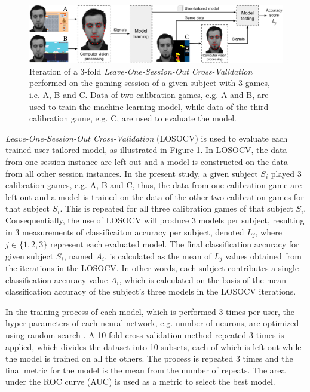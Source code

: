 \begin{figure}[ht]
    \centering
    \includegraphics[width=\textwidth]{Content/figures/machine-learning-investigation}
    \caption{Iteration of a 3-fold \textit{Leave-One-Session-Out Cross-Validation} performed on the gaming session of a given subject with 3 games, i.e. A, B and C. Data of two calibration games, e.g. A and B, are used to train the machine learning model, while data of the third calibration game, e.g. C, are used to evaluate the model.}
    \label{fig:study5-training-evaluation}
\end{figure}

\textit{Leave-One-Session-Out Cross-Validation} (LOSOCV) is used to evaluate each trained user-tailored model, as illustrated in Figure \ref{fig:study5-training-evaluation}. In LOSOCV, the data from one session instance are left out and a model is constructed on the data from all other session instances. In the present study, a given subject $S_i$ played 3 calibration games, e.g. A, B and C, thus, the data from one calibration game are left out and a model is trained on the data of the other two calibration games for that subject $S_i$. This is repeated for all three calibration games of that subject $S_i$. Consequentially, the use of LOSOCV will produce 3 models per subject, resulting in 3 measurements of classificaiton accuracy per subject, denoted $L_j$, where $j \in \{1, 2, 3\}$ represent each evaluated model. The final classification accuracy for given subject $S_i$, named $A_i$, is calculated as the mean of $L_j$ values obtained from the iterations in the LOSOCV. In other words, each subject contributes a single classification accuracy value $A_i$, which is calculated on the basis of the mean classification accuracy of the subject's three models in the LOSOCV iterations.

In the training process of each model, which is performed 3 times per user, the hyper-parameters of each neural network, e.g. number of neurons, are optimized using random search \parencite{bergstra2012random}. A 10-fold cross validation method repeated 3 times is applied, which divides the dataset into 10-subsets, each of which is left out while the model is trained on all the others. The process is repeated 3 times and the final metric for the model is the mean from the number of repeats. The area under the ROC curve (AUC) is used as a metric to select the best model.

